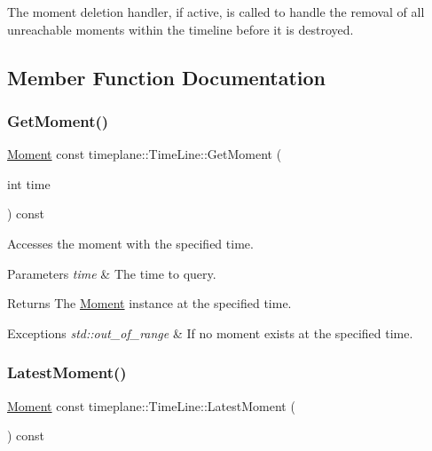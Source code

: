 The moment deletion handler, if active, is called to handle the removal of all unreachable moments within the timeline before it is destroyed. 

\subsection{Member Function Documentation}
\mbox{\label{classtimeplane_1_1_time_line_ae18ca86c0f036731e1bb148ed3381ea8}} 
\subsubsection{\texorpdfstring{Get\+Moment()}{GetMoment()}}
{\footnotesize\ttfamily \hyperlink{classtimeplane_1_1_moment}{Moment} const timeplane\+::\+Time\+Line\+::\+Get\+Moment (\begin{DoxyParamCaption}\item[{int}]{time }\end{DoxyParamCaption}) const}



Accesses the moment with the specified time. 


\begin{DoxyParams}{Parameters}
{\em time} & The time to query. \\
\hline
\end{DoxyParams}
\begin{DoxyReturn}{Returns}
The {\ttfamily \hyperlink{classtimeplane_1_1_moment}{Moment}} instance at the specified time. 
\end{DoxyReturn}

\begin{DoxyExceptions}{Exceptions}
{\em std\+::out\+\_\+of\+\_\+range} & If no moment exists at the specified time. \\
\hline
\end{DoxyExceptions}
\mbox{\label{classtimeplane_1_1_time_line_acc391553e5c45a647c82f27e53ae3af8}} 
\subsubsection{\texorpdfstring{Latest\+Moment()}{LatestMoment()}}
{\footnotesize\ttfamily \hyperlink{classtimeplane_1_1_moment}{Moment} const timeplane\+::\+Time\+Line\+::\+Latest\+Moment (\begin{DoxyParamCaption}{ }\end{DoxyParamCaption}) const\hspace{0.3cm}{\ttfamily [noexcept]}}



